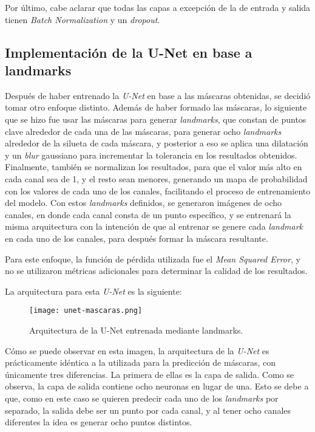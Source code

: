 \documentclass[runningheads]{llncs}
\begin{document}
Por último, cabe aclarar que todas las capas a excepción de la de entrada y salida tienen \textit{Batch Normalization} y un \textit{dropout}. 

\subsection{Implementación de la U-Net en base a landmarks}
Después de haber entrenado la \textit{U-Net} en base a las máscaras obtenidas, se decidió tomar otro enfoque distinto. Además de haber formado las máscaras, lo siguiente que se hizo fue usar las máscaras para generar \textit{landmarks}, que constan de puntos clave alrededor de cada una de las máscaras, para generar ocho \textit{landmarks} alrededor de la silueta de cada máscara, y posterior a eso se aplica una dilatación y un \textit{blur} gaussiano para incrementar la tolerancia en los resultados obtenidos. Finalmente, también se normalizan los resultados, para que el valor más alto en cada canal sea de 1, y el resto sean menores, generando un mapa de probabilidad con los valores de cada uno de los canales, facilitando el proceso de entrenamiento del modelo. Con estos \textit{landmarks} definidos, se generaron imágenes de ocho canales, en donde cada canal consta de un punto específico, y se entrenará la misma arquitectura con la intención de que al entrenar se genere cada \textit{landmark} en cada uno de los canales, para después formar la máscara resultante. 

Para este enfoque, la función de pérdida utilizada fue el \textit{Mean Squared Error}, y no se utilizaron métricas adicionales para determinar la calidad de los resultados. 

La arquitectura para esta \textit{U-Net} es la siguiente:

\begin{figure}[H]
    \centering
    \texttt{[image: unet-mascaras.png]}
    \caption{Arquitectura de la U-Net entrenada mediante landmarks.}
\end{figure}

Cómo se puede observar en esta imagen, la arquitectura de la \textit{U-Net} es prácticamente idéntica a la utilizada para la predicción de máscaras, con únicamente tres diferencias. La primera de ellas es la capa de salida. Como se observa, la capa de salida contiene ocho neuronas en lugar de una. Esto se debe a que, como en este caso se quieren predecir cada uno de los \textit{landmarks} por separado, la salida debe ser un punto por cada canal, y al tener ocho canales diferentes la idea es generar ocho puntos distintos.
\end{document}
